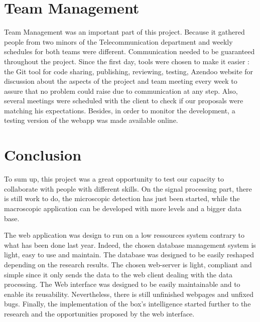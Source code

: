 %
%
\section{Team Management}

Team Management was an important part of this project. Because it gathered people from two minors of the Telecommunication department and weekly schedules for both teams were different. Communication needed to be guaranteed throughout the project. Since the first day, tools were chosen to make it easier : the Git tool for code sharing, publishing, reviewing, testing, Azendoo website for discussion about the aspects of the project and team meeting every week to assure that no problem could raise due to communication at any step. Also, several meetings were scheduled with the client to check if our proposals were matching his expectations. Besides, in order to monitor the development, a testing version of the webapp was made available online.\\

\section{Conclusion}

To sum up, this project was a great opportunity to test our capacity to collaborate with people with different skills. On the signal processing part, there is still work to do, the microscopic detection has just been started, while the macroscopic application can be developed with more levels and a bigger data base.

%
%
%

The web application was design to run on a low ressources system contrary to what has been done last year. Indeed, the chosen database management system is light, easy to use and maintain. The database was designed to be easily reshaped depending on the research results. The chosen web-server is light, compliant and simple since it only sends the data to the web client dealing with the data processing. The Web interface was designed to be easily maintainable and to enable its reusability. Nevertheless, there is still unfinished webpages and unfixed bugs. Finally, the implementation of the box's intelligence started further to the research and the opportunities proposed by the web interface.
